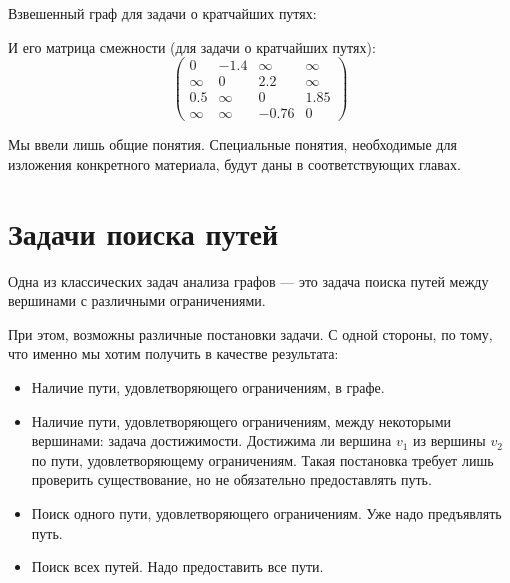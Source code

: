 \begin{example}
  Взвешенный граф для задачи о кратчайших путях:
  \begin{center}
  \end{center}

  И его матрица смежности (для задачи о кратчайших путях):
  $$
  \begin{pmatrix}
    0 & -1.4 & \infty & \infty \\
    \infty & 0 & 2.2 & \infty \\
    0.5 & \infty & 0 & 1.85 \\
    \infty & \infty & -0.76 & 0
  \end{pmatrix}
  $$
\end{example}

Мы ввели лишь общие понятия.
Специальные понятия, необходимые для изложения конкретного материала, будут даны в соответствующих главах.

\section{Задачи поиска путей}

Одна из классических задач анализа графов --- это задача поиска путей между вершинами с различными ограничениями.

При этом, возможны различные постановки задачи.
С одной стороны, по тому, что именно мы хотим получить в качестве результата:
\begin{itemize}
\item Наличие пути, удовлетворяющего ограничениям, в графе.
\item Наличие пути, удовлетворяющего ограничениям, между некоторыми вершинами: задача достижимости.
      Достижима ли вершина $v_1$ из вершины $v_2$ по пути, удовлетворяющему ограничениям.
      Такая постановка требует лишь проверить существование, но не обязательно предоставлять путь.
\item Поиск одного пути, удовлетворяющего ограничениям. Уже надо предъявлять путь.
\item Поиск всех путей. Надо предоставить все пути.
\end{itemize}

